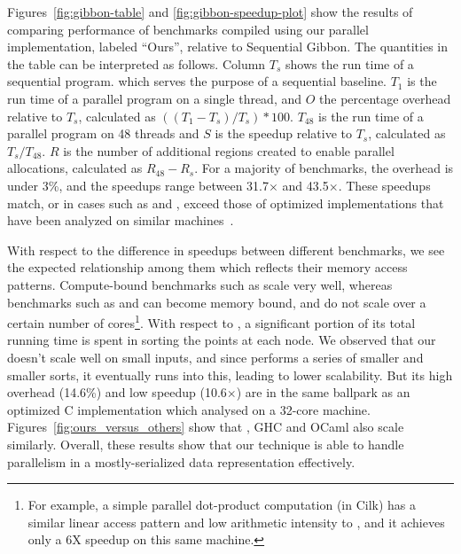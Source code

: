 \documentclass[acmsmall,acmthm=false,nonacm]{acmart}
\theoremstyle{straighttext0}
\theoremstyle{straighttext}
\newcommand{\new}[1]{#1}
\begin{document}
{Figures~\ref{fig:gibbon-table} and \ref{fig:gibbon-speedup-plot} show the results
of comparing performance of benchmarks compiled using our
%
parallel
%
implementation, labeled ``Ours'', relative to Sequential Gibbon.
%
The quantities in the table can be interpreted as follows.
%
Column $T_s$ shows the run time of a sequential program.
which serves the purpose of a sequential baseline.
%
$T_1$ is the run time of a parallel program on a single thread, and
$O$ the percentage overhead relative to $T_s$, calculated as
$((T_1 - T_s) / T_s) * 100$.
%
$T_{48}$ is the run time of a parallel program on 48 threads and
$S$ is the speedup relative to $T_s$, calculated as $T_s / T_{48}$.
$R$ is the number of additional regions created to enable
parallel allocations, calculated as $R_{48} - R_{s}$.
%
For a majority of benchmarks, the overhead is under 3\%,
and the speedups range between 31.7$\times$ and 43.5$\times$.
%
These speedups match, or in cases such as  and ,
exceed those of optimized implementations that have been analyzed on
similar machines~\cite{pbbs,MPL,Heartbeat_17}.

With respect to the difference in speedups between different benchmarks,
we see the expected relationship among them which reflects their memory access patterns.
%
Compute-bound benchmarks such as  scale very well,
whereas benchmarks such as  and 
can become memory bound, and do not scale over a certain number of cores\footnote{For example, a simple parallel dot-product computation (in Cilk) has a similar linear access pattern and low arithmetic intensity to , and it achieves only a 6X speedup on this same machine.}.
%
With respect to , a significant portion of its total running time is
spent in sorting the points at each node.
%
We observed that our  doesn't scale well on small inputs,
and since  performs a series of smaller and smaller sorts,
it eventually runs into this, leading to lower scalability.
%
But its high overhead (14.6\%) and low speedup (10.6$\times$)
are in the same ballpark as an optimized C implementation
which \citet{adve_kdtree} analysed on a 32-core machine.
%
Figures~\ref{fig:ours_versus_others}
\iftoggle{EXTND}{
  and \ref{fig:others-benchmark-results} (given in the Appendix)
}{
  and 15 (given in the Appendix of the extended version~\cite{ParallelLoCal-tr})
}
show that \MPL{}, GHC and OCaml also scale similarly.
%
Overall, these results show that our technique is able to handle
parallelism in a mostly-serialized data representation effectively.





}
\end{document}
